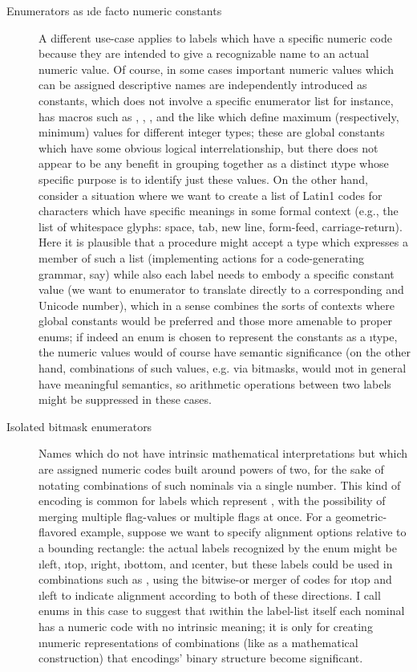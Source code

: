 {\begin{description}
\item[Enumerators as \i{de facto} numeric constants]  A different
use-case applies to labels which have a specific numeric code
because they are intended to give a recognizable name to an actual numeric value.
\> Of course, in some cases important numeric values which
can be assigned descriptive names are independently introduced as
constants, which does not involve a specific enumerator list
\mdash{} for instance, \CCpp{} has macros such as
\SHRTMAX{}, \INTMAX{}, \INTMIN{}, and the like which
define maximum (respectively, minimum) values for different
integer types; these are global constants which have some
obvious logical interrelationship, but there does not appear
to be any benefit in grouping together as a distinct \i{type}
whose specific purpose is to identify just these values.
\> On the other hand, consider a situation where we want to
create a list of Latin1 codes for characters which have
specific meanings in some formal context (e.g., the
list of whitespace glyphs: space, tab, new line, form-feed,
carriage-return). \> Here it is plausible that a procedure
might accept a type which expresses a member of such a
list (implementing actions for a code-generating grammar, say)
while also each label needs to embody a specific constant
value (we want to enumerator to translate directly to
a corresponding \ASCII{} and Unicode number), which in
a sense combines the sorts of contexts where global
constants would be preferred and those more
amenable to proper enums; if indeed an enum is chosen
to represent the constants as a \i{type},
the numeric values would of course have semantic
significance (on the other hand, combinations
of such values, e.g. via bitmasks, would \i{not}
in general have meaningful semantics, so
arithmetic operations between two labels
might be suppressed in these cases.

\item[Isolated bitmask enumerators]  Names which do not
have intrinsic mathematical interpretations but which are
assigned numeric codes built around powers of two,
for the sake of notating combinations of such nominals via a single
number. \> This kind of encoding is common for labels which
represent , with the possibility of merging multiple
flag-values or  multiple flags at once. \> For a
geometric-flavored example, suppose we want to specify alignment
options relative to a bounding rectangle: the actual
labels recognized by the enum might be \i{left}, \i{top}, \i{right},
\i{bottom}, and \i{center}, but these labels could be
used in combinations such as , using the bitwise-or
merger of codes for \i{top} and \i{left} to indicate alignment
according to both of these directions. \> I call enums in this
case  to suggest that \i{within the label-list itself}
each nominal has a numeric code with no intrinsic meaning; it is
only for creating \i{numeric} representations of
combinations (like \topbarleft{} as a mathematical construction)
that encodings' binary structure become significant.


\end{description}}
